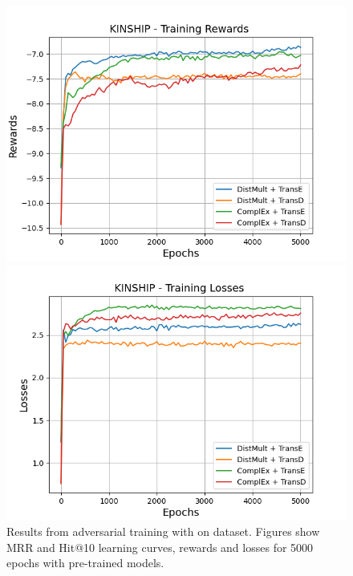 \begin{figure}
    \begin{minipage}{.45\textwidth}
      \centering
      \includegraphics[width=0.9\linewidth]{figures/results/gan_train/pretrained/uncertainty/max/entropy/kinship/5k_epochs/uncertainty_kinship_rew.png}
    \end{minipage}%
     \begin{minipage}{.45\textwidth}
      \centering
      \includegraphics[width=0.9\linewidth]{figures/results/gan_train/pretrained/uncertainty/max/entropy/kinship/5k_epochs/uncertainty_kinship_losses.png}
    \end{minipage}%
    \caption{Results from adversarial training with \usmax on \kinship dataset.
    Figures show MRR and Hit@10 learning curves, rewards and losses for 5000 epochs with pre-trained models.}
    \label{fig:gan_train_pretrained_usmax_kinship}
\end{figure}
